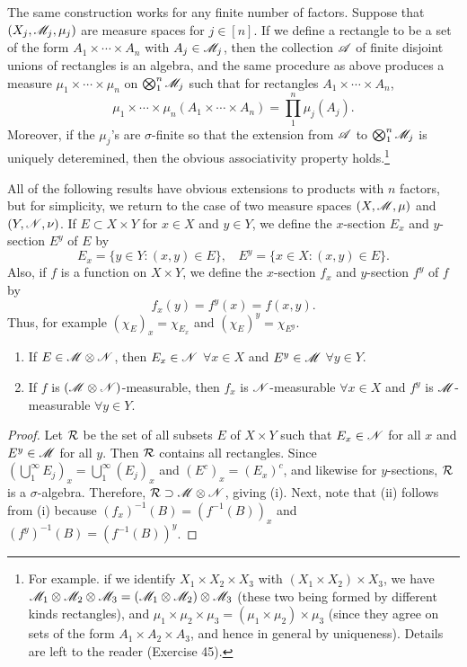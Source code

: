 \documentclass[12pt]{article} %
\begin{document}
The same construction works for any finite number of factors. Suppose that $(X_j, \mathscr{M}_j, \mu_j)$ are measure spaces for $j \in [n]$. If we define a rectangle to be a set of the form $A_1 \times \cdots \times A_n$ with $A_j \in \mathscr{M}_j$, then the collection $\mathscr{A}$ of finite disjoint unions of rectangles is an algebra, and the same procedure as above produces a measure $\mu_1 \times \cdots \times \mu_n$ on $\bigotimes_{1}^{n} \mathscr{M}_j$ such that for rectangles $A_1 \times \cdots \times A_n$, \[\mu_1 \times \cdots \times \mu_n(A_1 \times \cdots \times A_n) = \prod_1^n \mu_j(A_j).\] Moreover, if the $\mu_j$'s are $\sigma$-finite so that the extension from $\mathscr{A}$ to $\bigotimes_1^n \mathscr{M}_j$ is uniquely deteremined, then the obvious associativity property holds.\footnote{For example. if we identify $X_1 \times X_2 \times X_3$ with $(X_1 \times X_2) \times X_3$, we have $\mathscr{M}_1 \otimes \mathscr{M}_2 \otimes \mathscr{M}_3 = (\mathscr{M}_1 \otimes \mathscr{M}_2) \otimes \mathscr{M}_3$ (these two being formed by different kinds rectangles), and $\mu_1 \times \mu_2 \times \mu_3 = (\mu_1 \times \mu_2) \times \mu_3$ (since they agree on sets of the form $A_1 \times A_2 \times A_3$, and hence in general by uniqueness). Details are left to the reader (Exercise 45).}

All of the following results have obvious extensions to products with $n$ factors, but for simplicity, we return to the case of two measure spaces $(X, \mathscr{M}, \mu)$ and $(Y, \mathscr{N}, \nu)$. If $E \subset X \times Y$ for $x \in X$ and $y \in Y$, we define the $x$-section $E_x$ and $y$-section $E^y$ of $E$ by \[E_x = \{y \in Y : (x, y) \in E\}, \ \ \ \ E^y = \{x \in X : (x, y) \in E\}.\] Also, if $f$ is a function on $X \times Y$, we define the $x$-section $f_x$ and $y$-section $f^y$ of $f$ by \[f_x(y) = f^y(x) = f(x, y).\] Thus, for example $(\chi_E)_x = \chi_{E_x}$ and $(\chi_E)^y = \chi_{E^y}$.

\begin{proposition}
    \begin{enumerate}
        \item If $E \in \mathscr{M} \otimes \mathscr{N}$, then $E_x \in \mathscr{N}$ $\forall x \in X$ and $E^y \in \mathscr{M}$ $\forall y \in Y$.
        \item If $f$ is $(\mathscr{M} \otimes \mathscr{N})$-measurable, then $f_x$ is $\mathscr{N}$-measurable $\forall x \in X$ and $f^y$ is $\mathscr{M}$-measurable $\forall y \in Y$.
    \end{enumerate}
\end{proposition}

\begin{proof}
    Let $\mathcal{R}$ be the set of all subsets $E$ of $X \times Y$ such that $E_x \in \mathscr{N}$ for all $x$ and $E^y \in \mathscr{M}$ for all $y$. Then $\mathcal{R}$ contains all rectangles. Since $\left( \bigcup_1^\infty E_j \right)_x = \bigcup_1^\infty (E_j)_x$ and $(E^c)_x = (E_x)^c$, and likewise for $y$-sections, $\mathcal{R}$ is a $\sigma$-algebra. Therefore, $\mathcal{R} \supset \mathscr{M} \otimes \mathscr{N}$, giving (i). Next, note that (ii) follows from (i) because $(f_x)^{-1}(B) = (f^{-1}(B))_x$ and $(f^y)^{-1}(B) = (f^{-1}(B))^y$.
\end{proof}
\end{document}
